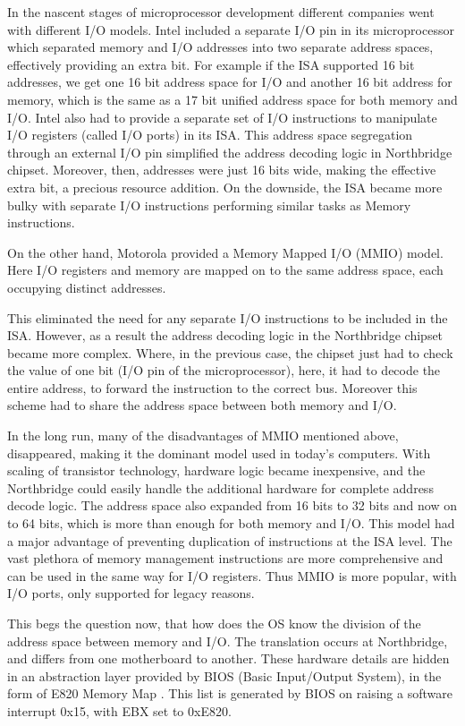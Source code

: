 In the nascent stages of microprocessor development different companies went with different I/O models. Intel included a separate I/O pin in its microprocessor which separated memory and I/O addresses into two separate address spaces, effectively providing an extra bit. For example if the ISA supported 16 bit addresses, we get one 16 bit address space for I/O and another 16 bit address for memory, which is the same as a 17 bit unified address space for both memory and I/O. Intel also had to provide a separate set of I/O instructions to manipulate I/O registers (called I/O ports) in its ISA. This address space segregation through an external I/O pin simplified the address decoding logic in Northbridge chipset. Moreover, then, addresses were just 16 bits wide, making the effective extra bit, a precious resource addition. On the downside, the ISA became more bulky with separate I/O instructions performing similar tasks as Memory instructions.

On the other hand, Motorola provided a Memory Mapped I/O (MMIO) model. Here I/O registers and memory are mapped on to the same address space, each occupying distinct addresses.

This eliminated the need for any separate I/O instructions to be included in the ISA. However, as a result the address decoding logic in the Northbridge chipset became more complex. Where, in the previous case, the chipset just had to check the value of one bit (I/O pin of the microprocessor), here, it had to decode the entire address, to forward the instruction to the correct bus. Moreover this scheme had to share the address space between both memory and I/O.

In the long run, many of the disadvantages of MMIO mentioned above, disappeared, making it the dominant model used in today's computers. With scaling of transistor technology, hardware logic became inexpensive, and the Northbridge could easily handle the additional hardware for complete address decode logic. The address space also expanded from 16 bits to 32 bits and now on to 64 bits, which is more than enough for both memory and I/O. This model had a major advantage of preventing duplication of instructions at the ISA level. The vast plethora of memory management instructions are more comprehensive and can be used in the same way for I/O registers. Thus MMIO is more popular, with I/O ports, only supported for legacy reasons. 

This begs the question now, that how does the OS know the division of the address space between memory and I/O. The translation occurs at Northbridge, and differs from one motherboard to another. These hardware details are hidden in an abstraction layer provided by BIOS (Basic Input/Output System), in the form of E820 Memory Map \cite{acpi_manual}. This list is generated by BIOS on raising a software interrupt 0x15, with EBX set to 0xE820. 

